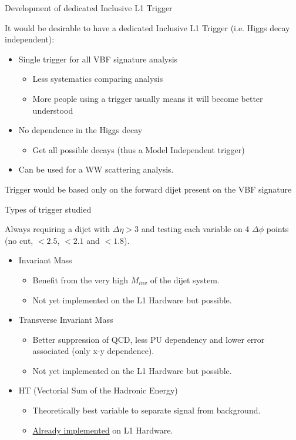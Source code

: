 \documentclass[8pt]{beamer}
\begin{document}
\begin{frame}{Development of dedicated Inclusive L1 Trigger}

It would be desirable to have a dedicated Inclusive L1 Trigger (i.e. Higgs decay independent):
\begin{block}

\begin{itemize}
  \item Single trigger for all VBF signature analysis
  \begin{itemize}
    \item Less systematics comparing analysis
    \item More people using a trigger usually means it will become better understood
  \end{itemize}
  \item No dependence in the Higgs decay
  \begin{itemize}
    \item Get all possible decays (thus a Model Independent trigger)
  \end{itemize}
  \item Can be used for a WW scattering analysis. 
\end{itemize}

\end{block}

Trigger would be based only on the forward dijet present on the VBF signature
\begin{block}{Types of trigger studied}
  
  Always requiring a dijet with $\Delta\eta>3$ and testing each variable on 4 $\Delta\phi$ points (no cut, $<2.5$,
  $<2.1$ and $<1.8$).

  \begin{itemize}
    \item Invariant Mass
    \begin{itemize}
      \item Benefit from the very high $M_{inv}$ of the dijet system.
      \item Not yet implemented on the L1 Hardware but possible.
    \end{itemize}
    \item Transverse Invariant Mass
    \begin{itemize}
      \item Better suppression of QCD, less PU dependency and lower error associated (only x-y dependence).
      \item Not yet implemented on the L1 Hardware but possible.
    \end{itemize}
    \item HT (Vectorial Sum of the Hadronic Energy) 
    \begin{itemize}
      \item Theoretically best variable to separate signal from background.
      \item \uline{Already implemented} on L1 Hardware.
    \end{itemize}
  \end{itemize}

\end{block}

\end{frame}
\end{document}
